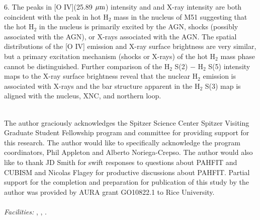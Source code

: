 \documentclass[manuscript]{aastex}
\begin{document}
6.  The peaks in [O IV](25.89 $\mbox{$\mu$m}$) intensity and and X-ray
intensity are both coincident with the peak in hot $\mathrm{H_2}$ mass
in the nucleus of M51 suggesting that the hot $\mathrm{H_2}$ in the
nucleus is primarily excited by the AGN, shocks (possibly associated
with the AGN), or X-rays associated with the AGN.  The spatial
distributions of the [O IV] emission and X-ray surface brightness are
very similar, but a primary excitation mechanism (shocks or X-rays) of
the hot $\mathrm{H_2}$ mass phase cannot be distinguished.  Further
comparison of the $\mathrm{H_2}$ S(2) $-$ $\mathrm{H_2}$ S(5)
intensity maps to the X-ray surface brightness reveal that the nuclear
$\mathrm{H_2}$ emission is associated with X-rays and the bar
structure apparent in the $\mathrm{H_2}$ S(3) map is aligned with the
nucleus, XNC, and northern loop.\\ \\

\acknowledgments

The author graciously acknowledges the Spitzer Science Center Spitzer
Visiting Graduate Student Fellowship program and committee for
providing support for this research.  The author would like to
specifically acknowledge the program coordinators, Phil Appleton and
Alberto Noriega-Crepso.  The author would also like to thank JD Smith
for swift responses to questions about PAHFIT and CUBISM and Nicolas
Flagey for productive discussions about PAHFIT.  Partial support for
the completion and preparation for publication of this study by the
author was provided by AURA grant GO10822.1 to Rice
University.\\ \\ {\it Facilities:} , ,
.
\end{document}
